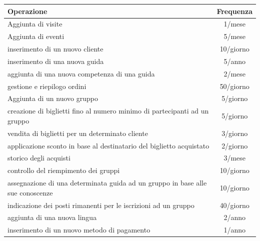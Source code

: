 \documentclass[a4paper,12pt]{report}
\begin{document}
\begin{table}[H]

	\begin{tabularx}{\textwidth}{Xc}
		\toprule
		Operazione                                                                             & Frequenza  \\
		\toprule

		Aggiunta di visite                                                                     & 1/mese     \\
		Aggiunta di eventi                                                                     & 5/mese     \\
		inserimento di un nuovo cliente                                                        & 10/giorno  \\
		inserimento di una nuova guida                                                         & 5/anno     \\
		aggiunta di una nuova competenza di una guida                                          & 2/mese     \\
		gestione e riepilogo ordini                                                            & 50/giorno  \\
		Aggiunta di un nuovo gruppo                                                            & 5/giorno   \\
		creazione di biglietti fino al numero minimo di partecipanti ad un gruppo              & 5/giorno   \\
		vendita di biglietti per un determinato cliente                                        & 3/giorno   \\
		applicazione sconto in base al destinatario del biglietto acquistato                   & 2/giorno   \\
		storico degli acquisti                                                                 & 3/mese     \\
		controllo del riempimento dei gruppi                                                   & 10/giorno  \\
		assegnazione di una determinata guida ad un gruppo in base alle sue conoscenze         & 10/giorno  \\
		indicazione dei posti rimanenti per le iscrizioni ad un gruppo                         & 40/giorno  \\
		aggiunta di una nuova lingua                                                           & 2/anno     \\
		inserimento di un nuovo metodo di pagamento                                            & 1/anno     \\

\end{tabularx}
\end{table}
\end{document}
